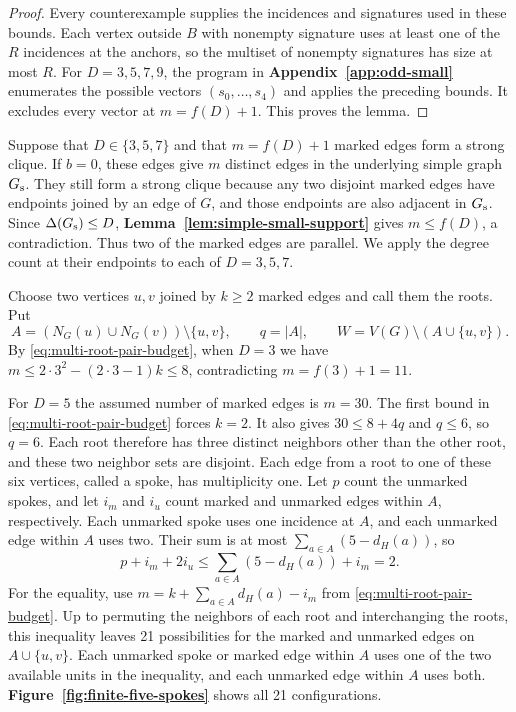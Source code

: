 \documentclass[preprint,11pt,numbers]{elsarticle-arxiv}
\numberwithin{equation}{section}
\theoremstyle{definition}
\begin{document}
\begin{proof}
Every counterexample supplies the incidences and signatures used
in these bounds. Each vertex outside $B$ with nonempty signature
uses at least one of the $R$ incidences at the anchors, so the
multiset of nonempty signatures has size at most $R$.
For $D=3,5,7,9$, the program in
\textbf{Appendix~\ref{app:odd-small}} enumerates the possible
vectors $(s_0,\ldots,s_4)$ and applies the preceding bounds.
It excludes every vector at $m=f(D)+1$. This proves the lemma.
\end{proof}
\relax\space%

Suppose that $D\in\{3,5,7\}$ and that $m=f(D)+1$ marked edges form
a strong clique. If $b=0$, these edges give $m$ distinct edges in
the underlying simple graph $G_{\rm s}$. They still form a strong clique
because any two disjoint marked edges have endpoints joined by an
edge of $G$, and those endpoints are also adjacent in $G_{\rm s}$. Since
$\Delta(G_{\rm s})\leq D$, \textbf{Lemma~\ref{lem:simple-small-support}}
gives $m\leq f(D)$, a contradiction. Thus two of the marked edges
are parallel. We apply the degree count at their endpoints to each of
$D=3,5,7$.

Choose two vertices $u,v$ joined by $k\geq2$ marked edges and
call them the roots. Put
\[
 A=(N_G(u)\cup N_G(v))\setminus\{u,v\},\qquad
 q=|A|,\qquad W=V(G)\setminus(A\cup\{u,v\}).
\]
By \eqref{eq:multi-root-pair-budget}, when $D=3$ we have
$m\leq 2\cdot3^2-(2\cdot3-1)k\leq8$, contradicting $m=f(3)+1=11$.

For $D=5$ the assumed number of marked edges is $m=30$.
The first bound in \eqref{eq:multi-root-pair-budget} forces $k=2$.
It also gives $30\leq8+4q$ and $q\leq6$, so $q=6$. Each root
therefore has three distinct neighbors other than the other root,
and these two neighbor sets are disjoint. Each edge from a root
to one of these six vertices, called a spoke, has multiplicity one.
Let $p$ count the unmarked spokes, and let $i_m$ and $i_u$ count
marked and unmarked edges within $A$, respectively. Each unmarked
spoke uses one incidence at $A$, and each unmarked edge within $A$
uses two. Their sum is at most $\sum_{a\in A}(5-d_H(a))$, so
\[
 p+i_m+2i_u\le\sum_{a\in A}(5-d_H(a))+i_m=2.
\]
For the equality, use $m=k+\sum_{a\in A}d_H(a)-i_m$ from
\eqref{eq:multi-root-pair-budget}.
Up to permuting the neighbors of each root and interchanging the
roots, this inequality leaves 21 possibilities for the marked and
unmarked edges on $A\cup\{u,v\}$. Each unmarked spoke or marked edge
within $A$ uses one of the two available units in the inequality,
and each unmarked edge within $A$ uses both.
\textbf{Figure~\ref{fig:finite-five-spokes}} shows all 21 configurations.
\end{document}
